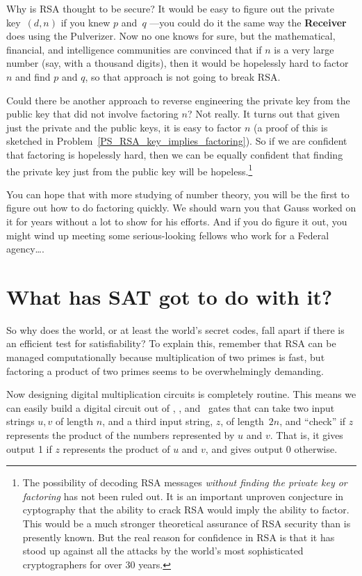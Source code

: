 
Why is RSA thought to be secure?  It would be easy to figure out the
private key~$(d, n)$ if you knew $p$ and~$q$ ---you could do it the
same way the \textbf{Receiver} does using the Pulverizer.  Now no one
knows for sure, but the mathematical, financial, and intelligence
communities are convinced that if $n$ is a very large number (say,
with a thousand digits), then it would be hopelessly hard to factor
$n$ and find $p$ and $q$, so that approach is not going to break RSA.

Could there be another approach to reverse engineering the private key
from the public key that did not involve factoring $n$?  Not really.
It turns out that given just the private and the public keys, it is
easy to factor $n$ (a proof of this is sketched in
Problem~\ref{PS_RSA_key_implies_factoring}).  So if we are confident
that factoring is hopelessly hard, then we can be equally confident
that finding the private key just from the public key will be
hopeless.\footnote{The possibility of decoding RSA messages
  \emph{without finding the private key or factoring} has not been
  ruled out.  It is an important unproven conjecture in cyptography
  that the ability to crack RSA would imply the ability to factor.
  This would be a much stronger theoretical assurance of RSA security
  than is presently known.  But the real reason for confidence in RSA
  is that it has stood up against all the attacks by the world's most
  sophisticated cryptographers for over 30 years.}

You can hope that with more studying of number theory, you will be the
first to figure out how to do factoring quickly.  We should warn you
that Gauss worked on it for years without a lot to show for his
efforts.  And if you do figure it out, you might wind up meeting some
serious-looking fellows who work for a Federal agency\dots.

\section{What has SAT got to do with it?}\label{SAT_RSA-sec}
So why does the world, or at least the world's secret codes, fall
apart if there is an efficient test for satisfiability?  To explain
this, remember that RSA can be managed computationally because
multiplication of two primes is fast, but factoring a product of two
primes seems to be overwhelmingly demanding.

Now designing digital multiplication circuits is completely routine.
This means we can easily build a digital circuit out of \QAND, \QOR,
and \QNOT\ gates that can take two input strings $u,v$ of length $n$,
and a third input string, $z$, of length~$2n$, and ``check'' if $z$
represents the product of the numbers represented by $u$ and $v$.
That is, it gives output 1 if $z$ represents the product of $u$ and
$v$, and gives output 0 otherwise.

